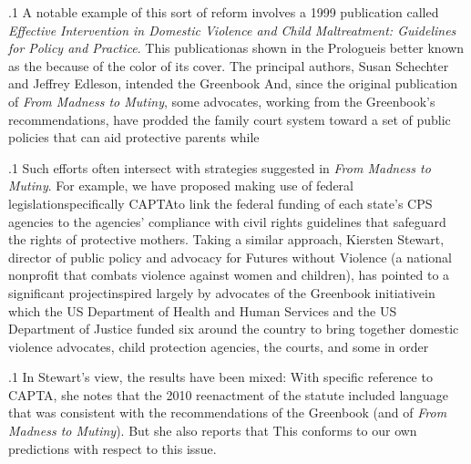 \documentclass[11pt, twoside]{article}
\begin{document}
{\p.1{%
A notable example of this sort of reform involves a 1999 publication
called \textit{Effective Intervention in Domestic Violence and Child Maltreatment: Guidelines for Policy and Practice}. This publication\mdash{}as shown in
the Prologue\mdash{}is better known as the  because of the color
of its cover. The principal authors, Susan Schechter and Jeffrey Edleson, intended the Greenbook  And, since the original publication
of \textit{From Madness to Mutiny}, some advocates, working from the Greenbook’s recommendations, have prodded the family court system toward
a set of public policies that can aid protective parents while 
}%

\p.1{%
Such efforts often intersect with strategies
suggested in \textit{From Madness to Mutiny}. For example, we have proposed making use of federal
legislation\mdash{}specifically CAPTA\mdash{}to link the federal funding of each
state’s CPS agencies to the agencies’ compliance with civil rights guidelines that safeguard the rights of protective mothers. Taking a similar
approach, Kiersten Stewart, director of public policy and advocacy for
Futures without Violence (a national nonprofit that combats violence
against women and children), has pointed to a significant
project\mdash{}inspired largely by advocates of the Greenbook initiative\mdash{}in which the
US Department of Health and Human Services and the US Department
of Justice funded six  around the country to bring
together domestic violence advocates, child protection agencies, the
courts, and some  in order 
}%

\p.1{%
In Stewart’s view, the results have been mixed:  With specific reference
to CAPTA, she notes that the 2010 reenactment of the statute included
language that was consistent with the recommendations of the Greenbook
(and of \textit{From Madness to Mutiny}). But she also reports that  This conforms
to our own predictions with respect to this issue.
}%

}
\end{document}
